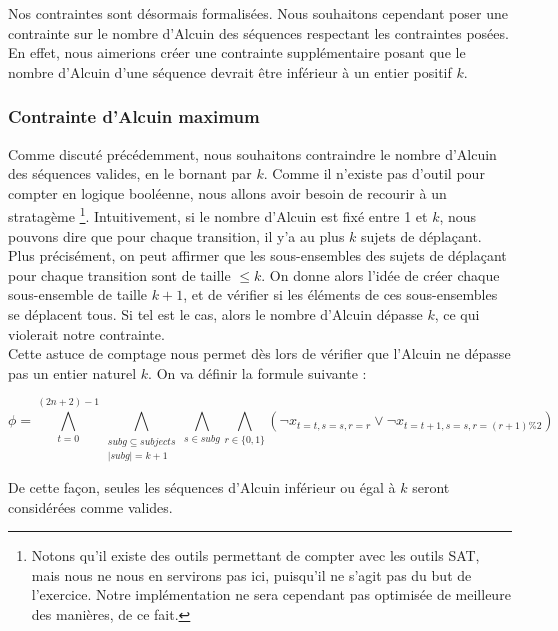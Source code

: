 \documentclass{article}
\begin{document}
\vspace{3em}

\noindent Nos contraintes sont désormais formalisées. Nous souhaitons cependant poser une contrainte sur le nombre d'Alcuin des séquences respectant les contraintes posées. En effet, nous aimerions créer une contrainte supplémentaire posant que le nombre d'Alcuin d'une séquence devrait être inférieur à un entier positif $k$.

\subsubsection{Contrainte d'Alcuin maximum}
\label{subsubsec:max_alcuin}

\noindent Comme discuté précédemment, nous souhaitons contraindre le nombre d'Alcuin des séquences valides, en le bornant par $k$. Comme il n'existe pas d'outil pour compter en logique booléenne, nous allons avoir besoin de recourir à un stratagème \footnote{Notons qu'il existe des outils permettant de compter avec les outils SAT, mais nous ne nous en servirons pas ici, puisqu'il ne s'agit pas du but de l'exercice. Notre implémentation ne sera cependant pas optimisée de meilleure des manières, de ce fait.}. Intuitivement, si le nombre d'Alcuin est fixé entre 1 et $k$, nous pouvons dire que pour chaque transition, il y'a au plus $k$ sujets de déplaçant. \\

\noindent Plus précisément, on peut affirmer que les sous-ensembles des sujets de déplaçant pour chaque transition sont de taille $\leq k$. On donne alors l'idée de créer chaque sous-ensemble de taille $k+1$, et de vérifier si les éléments de ces sous-ensembles se déplacent tous. Si tel est le cas, alors le nombre d'Alcuin dépasse $k$, ce qui violerait notre contrainte. \\

\noindent Cette astuce de comptage nous permet dès lors de vérifier que l'Alcuin ne dépasse pas un entier naturel $k$. On va définir la formule suivante :

\[
\phi =
\bigwedge_{t=0}^{(2n+2) - 1}
\bigwedge_{\substack{subg \subseteq subjects \\ \lvert subg \rvert = k+1}}
\bigwedge_{s \in subg}
\bigwedge_{r \in \{0, 1\}}
\left(
\lnot x_{t=t, s=s, r=r} \lor
\lnot x_{t=t+1, s=s, r=(r+1) \% 2}
\right)
\]

\noindent De cette façon, seules les séquences d'Alcuin inférieur ou égal à $k$ seront considérées comme valides.
\end{document}

